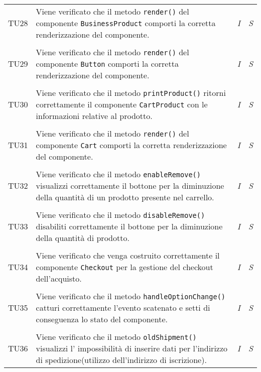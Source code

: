\begin{longtable}{ >{\centering}p{} >{}p{}
				>{\centering}p{} >{\centering}p{}}
			\tabularnewline
			\hypertarget{TU28}{TU28} & Viene verificato che il metodo 
			\texttt{render()} del componente \texttt{BusinessProduct} comporti 
			la corretta renderizzazione del componente. & 
			\textit{I} & 
			\textit{S}\\
			
			\tabularnewline
			\hypertarget{TU29}{TU29} & Viene verificato che il metodo 
			\texttt{render()} del componente \texttt{Button} comporti la 
			corretta renderizzazione del componente. & 
			\textit{I} & 
			\textit{S}\\
			
			\tabularnewline
			\hypertarget{TU30}{TU30} & Viene verificato che il metodo 
			\texttt{printProduct()} ritorni correttamente il componente 
			\texttt{CartProduct} con le informazioni relative al prodotto. & 
			\textit{I} & 
			\textit{S}\\
			
			\tabularnewline
			\hypertarget{TU31}{TU31} & Viene verificato che il metodo 
			\texttt{render()} del componente \texttt{Cart} comporti la corretta 
			renderizzazione del componente. & 
			\textit{I} & 
			\textit{S}\\
			
			\tabularnewline
			\hypertarget{TU32}{TU32} & Viene verificato che il metodo 
			\texttt{enableRemove()} visualizzi correttamente il bottone per la 
			diminuzione della quantità di un prodotto presente nel carrello. & 
			\textit{I} & 
			\textit{S}\\
			
			\tabularnewline
			\hypertarget{TU33}{TU33} & Viene verificato che il metodo 
			\texttt{disableRemove()} disabiliti correttamente il bottone per la 
			diminuzione della quantità di prodotto. & 
			\textit{I} & 
			\textit{S}\\
			
			\tabularnewline
			\hypertarget{TU34}{TU34} & Viene verificato che venga costruito 
			correttamente il componente \texttt{Checkout} per la gestione del 
			checkout dell'acquisto. & 
			\textit{I} & 
			\textit{S}\\
			
			\tabularnewline
			\hypertarget{TU35}{TU35} & Viene verificato che il metodo 
			\texttt{handleOptionChange()} catturi correttamente l'evento 
			scatenato e setti di conseguenza lo stato del componente. & 
			\textit{I} & 
			\textit{S}\\
			
			\tabularnewline
			\hypertarget{TU36}{TU36} & Viene verificato che il metodo 
			\texttt{oldShipment()} visualizzi l' impossibilità di inserire dati 
			per l'indirizzo di spedizione(utilizzo dell'indirizzo di 
			iscrizione). & 
			\textit{I} & 
			\textit{S}\\
			

\end{longtable}
